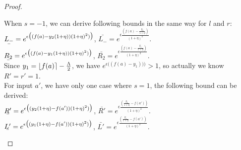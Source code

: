 \documentclass[a4paper,11pt]{article}
\begin{document}
\begin{proof}
\begin{itemize}
		When $s = -1$, we can derive following bounds in the same way for $l$ and $r$:\\
		$\ubar{L_-} = e^{\epsilon 
				\big( (f(a) - y_2(1 + \eta)) (1 + \eta)^2) \big)}$,
		$\bar{L_-} = e^{\epsilon 
				\frac{(f(a) - \frac{y_2}{1 + \eta})}{(1 + \eta)^2}}$.\\
		$\ubar{R_2} = e^{\epsilon 
				\big( (f(a) - y_1(1 + \eta)) (1 + \eta)^2) \big)}$, 
		$\bar{R_2} = e^{\epsilon 
				\frac{(f(a) - \frac{y_1}{1 + \eta})}{(1 + \eta)^2}}$.\\
		Since $y_1 = \lfloor f(a) \rceil - \frac{\Lambda}{2}$, 
		we have $e^{\epsilon \big( (f(a) - y_1)) \big)} > 1$, so actually we know $R' = r' = 1$.
		\\
		For input $a'$, we have only one case where $s = 1$, the following bound can be derived:
		\\
		$\ubar{R'} = e^{\epsilon 
				\big( (y_2(1 + \eta) - f(a')) (1 + \eta)^2) \big)}$, 
		$\bar{R'} = e^{\epsilon 
				\frac{(\frac{y_2}{1 + \eta} - f(a'))}{(1 + \eta)^2}}$.  
		\\
		$\ubar{L'} = e^{\epsilon 
				\big( (y_1(1 + \eta) - f(a')) (1 + \eta)^2) \big)}$, 
		$\bar{L'} = e^{\epsilon 
				\frac{(\frac{y_1}{1 + \eta} - f(a'))}{(1 + \eta)^2}}$.



\end{itemize}
\end{proof}
\end{document}
